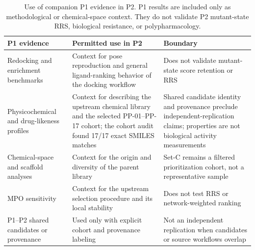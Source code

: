 \begin{table}[htbp]
\centering
\scriptsize
\caption{Use of companion P1 evidence in P2. P1 results are included only as methodological or chemical-space context. They do not validate P2 mutant-state RRS, biological resistance, or polypharmacology.}
\label{tab:s16_p1_context}
\begin{tabularx}{\textwidth}{>{\raggedright\arraybackslash}p{} >{\raggedright\arraybackslash}p{} X}
\toprule
P1 evidence & Permitted use in P2 & Boundary \\
\midrule
Redocking and enrichment benchmarks & Context for pose reproduction and general ligand-ranking behavior of the docking workflow & Does not validate mutant-state score retention or RRS \\
Physicochemical and drug-likeness profiles & Context for describing the upstream chemical library and the selected PP-01--PP-17 cohort; the cohort audit found 17/17 exact SMILES matches & Shared candidate identity and provenance preclude independent-replication claims; properties are not biological activity measurements \\
Chemical-space and scaffold analyses & Context for the origin and diversity of the parent library & Set-C remains a filtered prioritization cohort, not a representative sample \\
MPO sensitivity & Context for the upstream selection procedure and its local stability & Does not test RRS or network-weighted ranking \\
P1--P2 shared candidates or provenance & Used only with explicit cohort and provenance labeling & Not an independent replication when candidates or source workflows overlap \\
\bottomrule
\end{tabularx}
\end{table}

